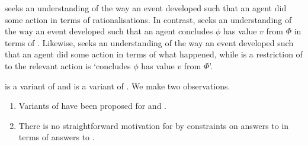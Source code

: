 \begin{note}
  \noindent%
  \qWhyR{} seeks an understanding of the way an event developed such that an agent did some action in terms of rationalisations.
  In contrast, \qWhy{} seeks an understanding of the way an event developed such that an agent concludes \(\phi\) has value \(v\) from \(\Phi\) in terms of .
  Likewise, \qHowR{} seeks an understanding of the way an event developed such that an agent did some action in terms of what happened, while \qHow{} is a restriction of \qHowR{} to  the relevant action is `concludes \(\phi\) has value \(v\) from \(\Phi\)'.
\end{note}

\begin{note}
  \qWhyR{} is a variant of \qWhy{} and \qHowR{} is a variant of \qHow{}.
  We make two observations.

  \begin{enumerate}
  \item
    Variants of \issueInclusion{} have been proposed for \qWhyR{} and \qHow{}.
  \item
    There is no straightforward motivation for \issueInclusion{} by constraints on answers to \qWhyR{} in terms of answers to \qHow{}.
  \end{enumerate}
\end{note}


